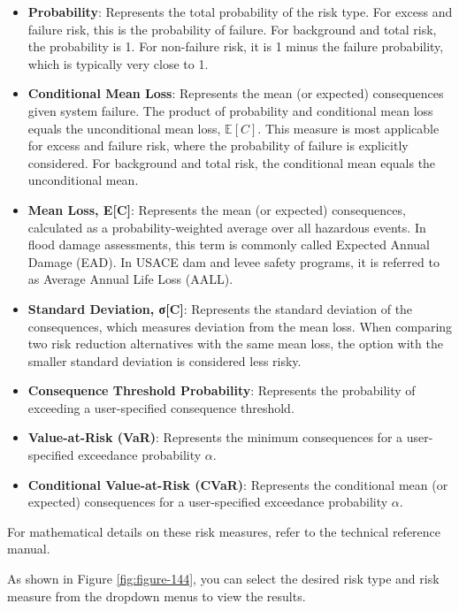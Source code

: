 \documentclass[
]{book}
\begin{document}
\begin{itemize}
\item
  \textbf{Probability}: Represents the total probability of the risk type. For excess and failure risk, this is the probability of failure. For background and total risk, the probability is 1. For non-failure risk, it is 1 minus the failure probability, which is typically very close to 1.
\item
  \textbf{Conditional Mean Loss}: Represents the mean (or expected) consequences given system failure. The product of probability and conditional mean loss equals the unconditional mean loss, \(\mathbb{E}[C]\). This measure is most applicable for excess and failure risk, where the probability of failure is explicitly considered. For background and total risk, the conditional mean equals the unconditional mean.
\item
  \textbf{Mean Loss, Ε{[}C{]}}: Represents the mean (or expected) consequences, calculated as a probability-weighted average over all hazardous events. In flood damage assessments, this term is commonly called Expected Annual Damage (EAD). In USACE dam and levee safety programs, it is referred to as Average Annual Life Loss (AALL).
\item
  \textbf{Standard Deviation, σ{[}C{]}}: Represents the standard deviation of the consequences, which measures deviation from the mean loss. When comparing two risk reduction alternatives with the same mean loss, the option with the smaller standard deviation is considered less risky.
\item
  \textbf{Consequence Threshold Probability}: Represents the probability of exceeding a user-specified consequence threshold.
\item
  \textbf{Value-at-Risk (VaR)}: Represents the minimum consequences for a user-specified exceedance probability \(\alpha\).
\item
  \textbf{Conditional Value-at-Risk (CVaR)}: Represents the conditional mean (or expected) consequences for a user-specified exceedance probability \(\alpha\).
\end{itemize}

For mathematical details on these risk measures, refer to the technical reference manual\citep{cite-TechRef}.

As shown in Figure \ref{fig:figure-144}, you can select the desired risk type and risk measure from the dropdown menus to view the results.
\end{document}
